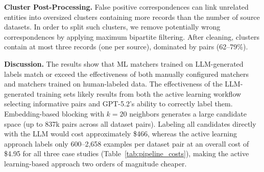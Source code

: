 \textbf{Cluster Post-Processing.} False positive correspondences can link unrelated entities into oversized clusters containing more records than the number of source datasets. In order to split such clusters, we remove potentially wrong correspondences by applying maximum bipartite filtering. After cleaning, clusters contain at most three records (one per source), dominated by pairs (62--79\%).


\textbf{Discussion.}
\label{sec:em_limitations}
The results show that ML matchers trained on LLM-generated labels match or exceed the effectiveness of both manually configured matchers and matchers trained on human-labeled data. The effectiveness of the LLM-generated training sets likely results from both the active learning workflow selecting informative pairs and GPT-5.2's ability to correctly label them. Embedding-based blocking with $k{=}20$ neighbors generates a large candidate space (up to 837k pairs across all dataset pairs). Labeling all candidates directly with the LLM would cost approximately \$466, whereas the active learning approach labels only 600--2,658 examples per dataset pair at an overall cost of \$4.95 for all three case studies (Table~\ref{tab:pipeline_costs}), making the active learning-based approach two orders of magnitude cheaper. 